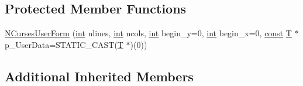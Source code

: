 \subsection*{Protected Member Functions}
\begin{DoxyCompactItemize}
\item 
\hyperlink{class_n_curses_user_form_a05134d66849e5c7a7812ab242270ff6d}{N\-Curses\-User\-Form} (\hyperlink{term__entry_8h_ad65b480f8c8270356b45a9890f6499ae}{int} nlines, \hyperlink{term__entry_8h_ad65b480f8c8270356b45a9890f6499ae}{int} ncols, \hyperlink{term__entry_8h_ad65b480f8c8270356b45a9890f6499ae}{int} begin\-\_\-y=0, \hyperlink{term__entry_8h_ad65b480f8c8270356b45a9890f6499ae}{int} begin\-\_\-x=0, \hyperlink{term__entry_8h_a57bd63ce7f9a353488880e3de6692d5a}{const} \hyperlink{curses_8priv_8h_a5ef253115820acf7d27f3c5c3b02a0f0}{T} $\ast$p\-\_\-\-User\-Data=S\-T\-A\-T\-I\-C\-\_\-\-C\-A\-S\-T(\hyperlink{curses_8priv_8h_a5ef253115820acf7d27f3c5c3b02a0f0}{T} $\ast$)(0))
\end{DoxyCompactItemize}
\subsection*{Additional Inherited Members}


